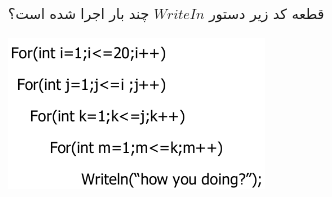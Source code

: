 \EXERCISE
قطعه کد زیر دستور
$WriteIn$
چند بار اجرا شده است؟
\begin{center}
\includegraphics[height=4cm]{14.png}
\end{center}
